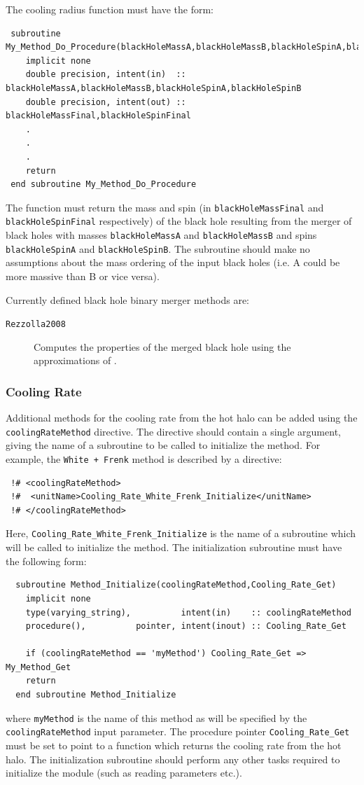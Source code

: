 The cooling radius function must have the form:
\begin{verbatim}
 subroutine My_Method_Do_Procedure(blackHoleMassA,blackHoleMassB,blackHoleSpinA,blackHoleSpinB,blackHoleMassFinal,blackHoleSpinFinal)
    implicit none
    double precision, intent(in)  :: blackHoleMassA,blackHoleMassB,blackHoleSpinA,blackHoleSpinB
    double precision, intent(out) :: blackHoleMassFinal,blackHoleSpinFinal
    .
    .
    .
    return
 end subroutine My_Method_Do_Procedure
\end{verbatim}
The function must return the mass and spin (in {\tt blackHoleMassFinal} and {\tt blackHoleSpinFinal} respectively) of the black hole resulting from the merger of black holes with masses {\tt blackHoleMassA} and {\tt blackHoleMassB} and spins {\tt blackHoleSpinA} and {\tt blackHoleSpinB}. The subroutine should make no assumptions about the mass ordering of the input black holes (i.e. A could be more massive than B or vice versa).

Currently defined black hole binary merger methods are:
\begin{description}
 \item [{\tt Rezzolla2008}] Computes the properties of the merged black hole using the approximations of \cite{rezzolla_final_2008}.
\end{description}

\subsubsection{Cooling Rate}

Additional methods for the cooling rate from the hot halo can be added using the {\tt coolingRateMethod} directive. The directive should contain a single argument, giving the name of a subroutine to be called to initialize the method. For example, the {\tt White + Frenk} method is described by a directive:
\begin{verbatim}
 !# <coolingRateMethod>
 !#  <unitName>Cooling_Rate_White_Frenk_Initialize</unitName>
 !# </coolingRateMethod>
\end{verbatim}
Here, {\tt Cooling\_Rate\_White\_Frenk\_Initialize} is the name of a subroutine which will be called to initialize the method. The initialization subroutine must have the following form:
\begin{verbatim}
  subroutine Method_Initialize(coolingRateMethod,Cooling_Rate_Get)
    implicit none
    type(varying_string),          intent(in)    :: coolingRateMethod
    procedure(),          pointer, intent(inout) :: Cooling_Rate_Get
    
    if (coolingRateMethod == 'myMethod') Cooling_Rate_Get => My_Method_Get
    return
  end subroutine Method_Initialize
\end{verbatim}
where {\tt myMethod} is the name of this method as will be specified by the {\tt coolingRateMethod} input parameter. The procedure pointer {\tt Cooling\_Rate\_Get} must be set to point to a function which returns the cooling rate from the hot halo. The initialization subroutine should perform any other tasks required to initialize the module (such as reading parameters etc.).

